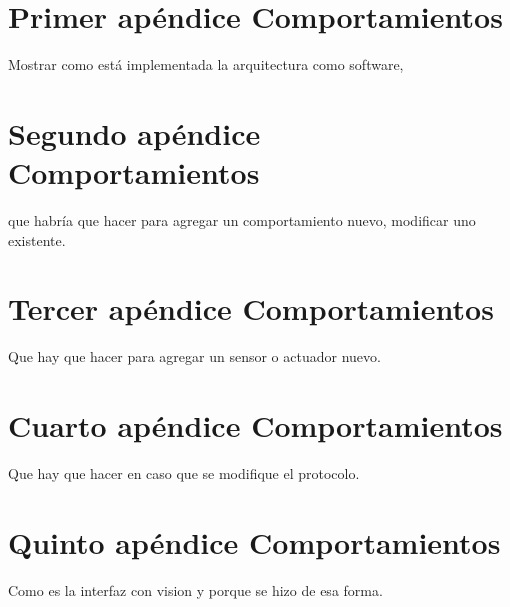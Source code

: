
\section{Primer ap\'endice Comportamientos}
Mostrar como est\'a implementada la arquitectura como software,

\section{Segundo ap\'endice Comportamientos}
que habr\'ia que hacer para agregar un comportamiento nuevo, modificar
uno existente.

\section{Tercer ap\'endice Comportamientos}
Que hay que hacer para agregar un sensor o actuador nuevo.

\section{Cuarto ap\'endice Comportamientos}
Que hay que hacer en caso que se modifique el protocolo.

\section{Quinto ap\'endice Comportamientos}
Como es la interfaz con vision y porque se hizo de esa forma.

